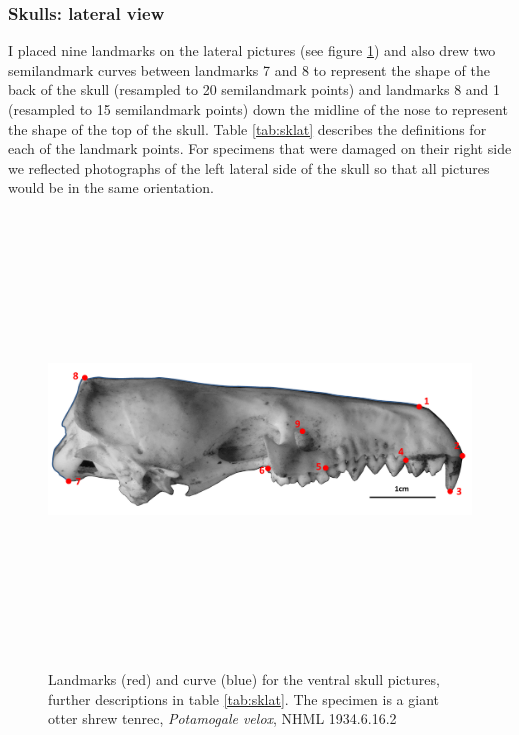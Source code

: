 \documentclass[12pt,a4paper]{article}
\begin{document}
\subsubsection{Skulls: lateral view}
I placed nine landmarks on the lateral pictures (see figure \ref{fig:sklat_landmarks}) and also drew two semilandmark curves between landmarks 7 and 8 to represent the shape of the back of the skull (resampled to 20 semilandmark points) and landmarks 8 and 1 (resampled to 15 semilandmark points) down the midline of the nose to represent the shape of the top of the skull. Table \ref{tab:sklat} describes the definitions for each of the landmark points. 
For specimens that were damaged on their right side we reflected photographs of the left lateral side of the skull so that all pictures would be in the same orientation.

\begin{figure}[H] 
  \centering
  \includegraphics[width=12cm, height=12cm, keepaspectratio=true]
  {figures/sklat_landmarks_pot_vel.png}
    \caption {Landmarks (red) and curve (blue) for the ventral skull pictures, further descriptions in table \ref{tab:sklat}. The specimen is a giant otter shrew tenrec, \textit{Potamogale velox}, NHML 1934.6.16.2}
  \label{fig:sklat_landmarks}
  \end{figure}


\begin{table}[h]
\caption{Descriptions of the landmarks (points) and curves (semilandmarks) for the skulls in ventral view (see Figure \ref{fig:sklat_landmarks}.} 

\label{tab:sklat}
\end{table}
\end{document}
